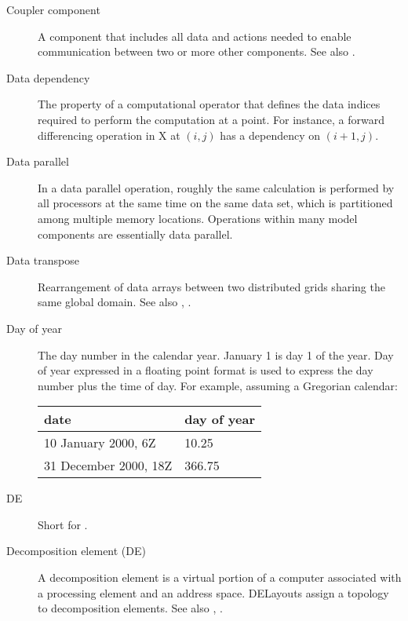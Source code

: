 \begin{description}
\item[Coupler component] \label{glos:Coupler}
  A component that includes all data and actions needed to enable 
  communication between two or more other components. 
  See also . 

\item[Data dependency] \label{glos:DataDep} The property of a computational
  operator that defines the data indices required to perform
  the computation at a point.  For instance, a forward differencing
  operation in X at $(i,j)$ has a dependency on $(i+1,j)$.

\item[Data parallel] \label{glos:DataParallel} In a data parallel operation,
  roughly the same calculation is performed by all processors at the same 
  time on the same data set, which is partitioned among multiple memory 
  locations.  Operations within many model components are essentially data 
  parallel.  

\item[Data transpose] \label{glos:DataTranspose} Rearrangement of data arrays 
  between two distributed grids sharing the same global domain.
  See also , 
  .

\item[Day of year] \label{glos:DayOfYear} The day number in the calendar year. 
  January 1 is day 1 of the year. Day of year expressed in a floating point 
  format is used to express the day number plus the time of day. 
  For example, assuming a Gregorian calendar:

\begin{tabular}{ll}
  {\bf date}              & {\bf day of year} \\
  \hline 
  10 January 2000, 6Z     & 10.25 \\
  31 December 2000, 18Z   & 366.75 
\end{tabular}

\item[DE] \label{glos:DE} 
  Short for .

\item[Decomposition element (DE)] \label{glos:Decomp_Element}
  A decomposition element is a virtual portion of a computer 
  associated with a processing element and an address space.  
  DELayouts assign a topology to decomposition elements. 
  See also , .


\end{description}
